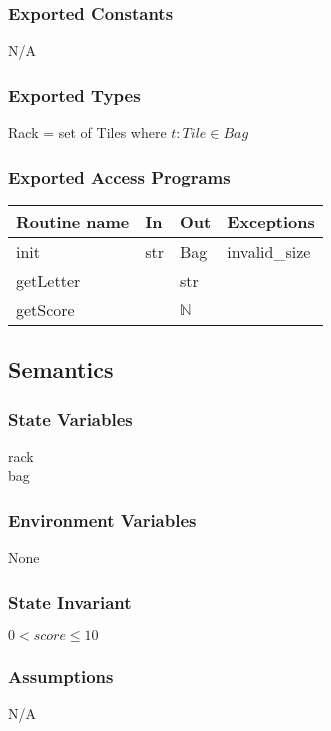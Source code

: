 \documentclass[12pt]{article}
\begin{document}
\subsubsection* {Exported Constants}
N/A
\subsubsection* {Exported Types}

Rack = set of Tiles where $t : Tile \in Bag$

\subsubsection* {Exported Access Programs}

\begin{tabular}{| l | l | l | l |}
\hline
\textbf{Routine name} & \textbf{In} & \textbf{Out} & \textbf{Exceptions}\\
\hline
init & str & Bag & invalid\_size \\
\hline
getLetter &  & str & \\
\hline
getScore & & $\mathbb{N}$ & \\
\hline
\end{tabular}

\subsection* {Semantics}

\subsubsection* {State Variables}
rack \\
bag \\
\subsubsection* {Environment Variables}
None
\subsubsection* {State Invariant}
$0 < score \leq 10$
\subsubsection* {Assumptions}

N/A

\begin{itemize}

\end{itemize}
\end{document}
